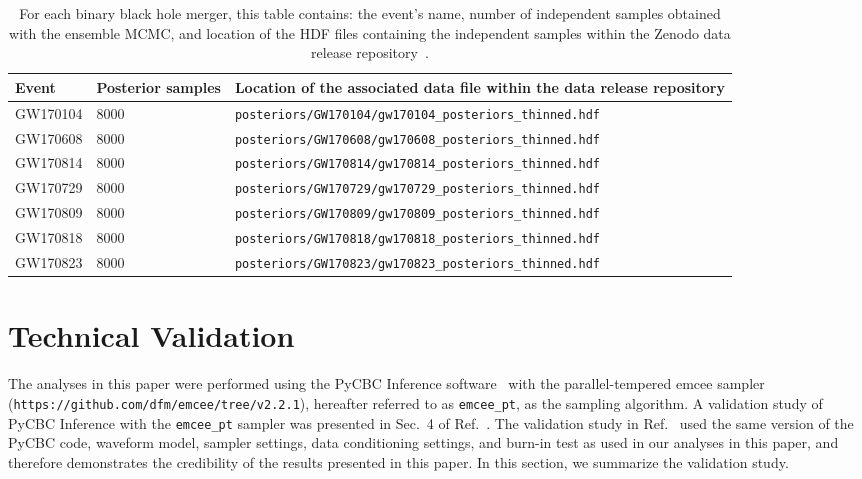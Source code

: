 \vspace{0.5cm}
\begin{table}[t]
\begin{adjustwidth}{-0.3cm}{}
\begin{tabular}{ |p{2cm}||p{1.5cm}|p{11cm}|  }
 \hline
 Event & Posterior samples & Location of the associated data file within the data release repository \\
 \hline
 \hline
 GW170104 & 8000 & \verb"posteriors/GW170104/gw170104_posteriors_thinned.hdf" \\
 \hline
 GW170608 & 8000 & \verb"posteriors/GW170608/gw170608_posteriors_thinned.hdf" \\
 \hline 
 GW170814 & 8000 & \verb"posteriors/GW170814/gw170814_posteriors_thinned.hdf" \\
 \hline
 GW170729 & 8000 & \verb"posteriors/GW170729/gw170729_posteriors_thinned.hdf" \\
 \hline
 GW170809 & 8000 & \verb"posteriors/GW170809/gw170809_posteriors_thinned.hdf" \\
 \hline
 GW170818 & 8000 & \verb"posteriors/GW170818/gw170818_posteriors_thinned.hdf" \\
 \hline
 GW170823 & 8000 & \verb"posteriors/GW170823/gw170823_posteriors_thinned.hdf" \\
 \hline
\end{tabular}
\caption{For each binary black hole merger, this table contains: the event's name, number of independent samples obtained with the ensemble MCMC, and location of the HDF files containing the independent samples within the Zenodo data release repository~\cite{data_release}.\label{tab:data_rec}}
\end{adjustwidth}
\end{table}
\vspace{0.5cm}


\section{Technical Validation}\label{sec:validation}

The analyses in this paper were performed using the PyCBC Inference software~\cite{Biwer:2018osg} with the parallel-tempered emcee sampler~\cite{emcee,mcmc} \newline (\verb"https://github.com/dfm/emcee/tree/v2.2.1"), hereafter referred to as \texttt{emcee\_pt}, as the sampling algorithm. A validation study of PyCBC Inference with the \texttt{emcee\_pt} sampler was presented in Sec.~4 of Ref.~\cite{Biwer:2018osg}. The validation study in Ref.~\cite{Biwer:2018osg} used the same version of the PyCBC code, waveform model, sampler settings, data conditioning settings, and burn-in test as used in our analyses in this paper, and therefore demonstrates the credibility of the results presented in this paper. In this section, we summarize the validation study.

